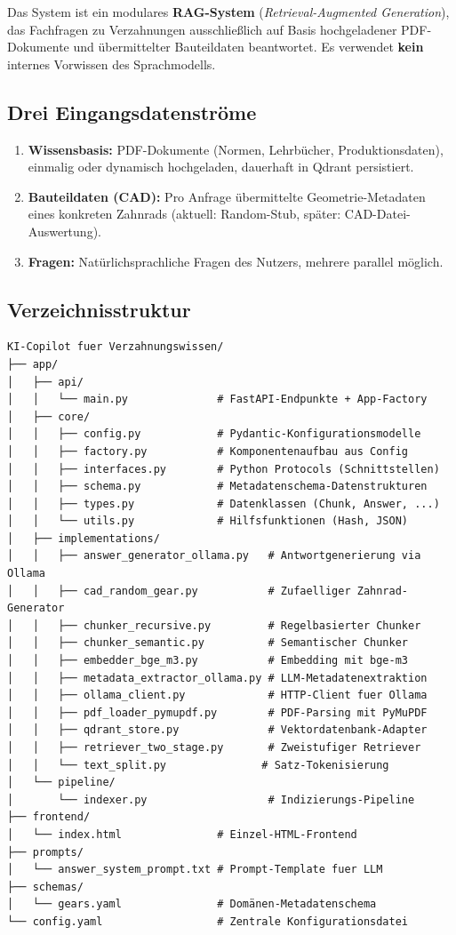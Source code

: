 \documentclass[12pt, a4paper]{article}
\begin{document}
Das System ist ein modulares \textbf{RAG-System} (\textit{Retrieval-Augmented Generation}),
das Fachfragen zu Verzahnungen ausschließlich auf Basis hochgeladener PDF-Dokumente und
übermittelter Bauteildaten beantwortet. Es verwendet \textbf{kein} internes Vorwissen
des Sprachmodells.

\subsection{Drei Eingangsdatenströme}

\begin{enumerate}[leftmargin=2cm]
  \item \textbf{Wissensbasis:} PDF-Dokumente (Normen, Lehrbücher, Produktionsdaten),
        einmalig oder dynamisch hochgeladen, dauerhaft in Qdrant persistiert.
  \item \textbf{Bauteildaten (CAD):} Pro Anfrage übermittelte Geometrie-Metadaten
        eines konkreten Zahnrads (aktuell: Random-Stub, später: CAD-Datei-Auswertung).
  \item \textbf{Fragen:} Natürlichsprachliche Fragen des Nutzers, mehrere parallel möglich.
\end{enumerate}

\subsection{Verzeichnisstruktur}

\begin{lstlisting}[style=yamlstyle, caption={Verzeichnisstruktur des Projekts}]
KI-Copilot fuer Verzahnungswissen/
├── app/
│   ├── api/
│   │   └── main.py              # FastAPI-Endpunkte + App-Factory
│   ├── core/
│   │   ├── config.py            # Pydantic-Konfigurationsmodelle
│   │   ├── factory.py           # Komponentenaufbau aus Config
│   │   ├── interfaces.py        # Python Protocols (Schnittstellen)
│   │   ├── schema.py            # Metadatenschema-Datenstrukturen
│   │   ├── types.py             # Datenklassen (Chunk, Answer, ...)
│   │   └── utils.py             # Hilfsfunktionen (Hash, JSON)
│   ├── implementations/
│   │   ├── answer_generator_ollama.py   # Antwortgenerierung via Ollama
│   │   ├── cad_random_gear.py           # Zufaelliger Zahnrad-Generator
│   │   ├── chunker_recursive.py         # Regelbasierter Chunker
│   │   ├── chunker_semantic.py          # Semantischer Chunker
│   │   ├── embedder_bge_m3.py           # Embedding mit bge-m3
│   │   ├── metadata_extractor_ollama.py # LLM-Metadatenextraktion
│   │   ├── ollama_client.py             # HTTP-Client fuer Ollama
│   │   ├── pdf_loader_pymupdf.py        # PDF-Parsing mit PyMuPDF
│   │   ├── qdrant_store.py              # Vektordatenbank-Adapter
│   │   ├── retriever_two_stage.py       # Zweistufiger Retriever
│   │   └── text_split.py               # Satz-Tokenisierung
│   └── pipeline/
│       └── indexer.py                   # Indizierungs-Pipeline
├── frontend/
│   └── index.html               # Einzel-HTML-Frontend
├── prompts/
│   └── answer_system_prompt.txt # Prompt-Template fuer LLM
├── schemas/
│   └── gears.yaml               # Domänen-Metadatenschema
└── config.yaml                  # Zentrale Konfigurationsdatei
\end{lstlisting}
\end{document}
